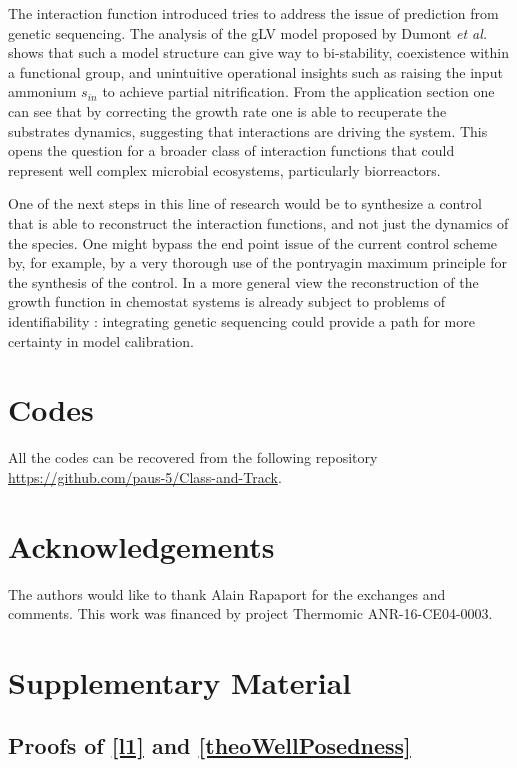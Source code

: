 \documentclass[3p,times]{article}
\begin{document}
The interaction function introduced tries to address the issue of prediction from genetic sequencing. The analysis of the gLV model proposed by Dumont \textit{et al.} \cite{Dumont2016} shows that such a model structure can give way to bi-stability, coexistence within a functional group, and unintuitive operational insights such as raising the input ammonium $s_{in}$ to achieve partial nitrification. From the application section one can see that by correcting the growth rate one is able to recuperate the substrates dynamics, suggesting that interactions are driving the system. This opens the question for a broader class of interaction functions that could represent well complex microbial ecosystems, particularly biorreactors. 

One of the next steps in this line of research would be to synthesize a control that is able to reconstruct the interaction functions, and not just the dynamics of the species. One might bypass the end point issue of the current control scheme by, for example, by a very thorough use of the pontryagin maximum principle for the synthesis of the control. In a more general view the reconstruction of the growth function in chemostat systems is already subject to problems of identifiability \cite{Dochain2003}: integrating genetic sequencing could provide a path for more certainty in model calibration.


\section{Codes}

All the codes can be recovered from the following repository \url{https://github.com/paus-5/Class-and-Track}.
\section{Acknowledgements}
 The authors would like to thank Alain Rapaport for the exchanges and comments. This work was financed by project Thermomic ANR-16-CE04-0003.

\section{Supplementary Material}

\subsection{Proofs of \cref{l1} and \cref{theoWellPosedness}}
\end{document}
